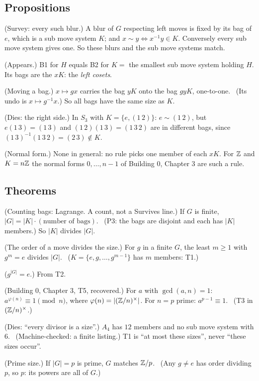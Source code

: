\subsection*{Propositions}

\begin{lines}
\item[\lab{P1}] (Survey: every such blur.) A blur of $G$ respecting left moves is fixed by its bag of $e$, which is a sub move system $K$; and $x \sim y \iff x^{-1} y \in K$. Conversely every sub move system gives one. So these blurs and the sub move systems match.
\item[\lab{P2}] (Appears.) B1 for $H$ equals B2 for $K = $ the smallest sub move system holding $H$. Its bags are the $x K$: the \emph{left cosets}.
\item[\lab{P3}] (Moving a bag.) $x \mapsto g x$ carries the bag $yK$ onto the bag $gyK$, one-to-one. \ (Its undo is $x \mapsto g^{-1} x$.) So all bags have the same size as $K$.
\item[\lab{P4}] (Dies: the right side.) In $S_3$ with $K = \{e, (1\,2)\}$: $e \sim (1\,2)$, but $e (1\,3) = (1\,3)$ and $(1\,2)(1\,3) = (1\,3\,2)$ are in different bags, since $(1\,3)^{-1}(1\,3\,2) = (2\,3) \notin K$.
\item[\lab{P5}] (Normal form.) None in general: no rule picks one member of each $xK$. For $\mathbb{Z}$ and $K = n\mathbb{Z}$ the normal forms $0, \dots, n - 1$ of Building 0, Chapter 3 are such a rule.
\end{lines}

\subsection*{Theorems}

\begin{lines}
\item[\lab{T1}] (Counting bags: Lagrange. A count, not a Survives line.) If $G$ is finite, $|G| = |K| \cdot (\text{number of bags})$. \ (P3: the bags are disjoint and each has $|K|$ members.) So $|K|$ divides $|G|$.
\item[\lab{T2}] (The order of a move divides the size.) For $g$ in a finite $G$, the least $m \ge 1$ with $g^m = e$ divides $|G|$. \ ($K = \{e, g, \dots, g^{m-1}\}$ has $m$ members: T1.)
\item[\lab{T3}] ($g^{|G|} = e$.) From T2.
\item[\lab{T4}] (Building 0, Chapter 3, T5, recovered.) For $a$ with $\gcd(a, n) = 1$: $a^{\varphi(n)} \equiv 1 \pmod n$, where $\varphi(n) = |(\mathbb{Z}/n)^\times|$. For $n = p$ prime: $a^{p-1} \equiv 1$. \ (T3 in $(\mathbb{Z}/n)^\times$.)
\item[\lab{T5}] (Dies: ``every divisor is a size''.) $A_4$ has $12$ members and no sub move system with $6$. \ (Machine-checked: a finite listing.) T1 is ``at most these sizes'', never ``these sizes occur''.
\item[\lab{T6}] (Prime size.) If $|G| = p$ is prime, $G$ matches $\mathbb{Z}/p$. \ (Any $g \ne e$ has order dividing $p$, so $p$: its powers are all of $G$.)
\end{lines}

